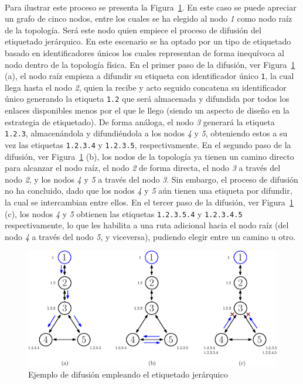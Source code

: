 \\
Para ilustrar este proceso se presenta la Figura~\ref{fig:sota_8_topo_difusion_1}. En este caso se puede apreciar un grafo de cinco nodos, entre los cuales se ha elegido al nodo \textit{1} como nodo raíz de la topología. Será este nodo quien empiece el proceso de difusión del etiquetado jerárquico. En este escenario se ha optado por un tipo de etiquetado basado en identificadores únicos los cuales representan de forma inequívoca al nodo dentro de la topología física. En el primer paso de la difusión, ver  Figura~\ref{fig:sota_8_topo_difusion_1} (a), el nodo raíz empieza a difundir su etiqueta con identificador único \texttt{1}, la cual llega hasta el nodo \textit{2}, quien la recibe y acto seguido concatena su identificador único generando la etiqueta \texttt{1.2} que será almacenada y difundida por todos los enlaces disponibles menos por el que le llego (siendo un aspecto de diseño en la estrategia de etiquetado). De forma análoga, el nodo \textit{3} generará la etiqueta \texttt{1.2.3}, almacenándola y difundiéndola a los nodos \textit{4} y \textit{5}, obteniendo estos a su vez las etiquetas \texttt{1.2.3.4} y \texttt{1.2.3.5}, respectivamente. En el segundo paso de la difusión, ver  Figura~\ref{fig:sota_8_topo_difusion_1} (b), los nodos de la topología ya tienen un camino directo para alcanzar el nodo raíz, el nodo \textit{2} de forma directa, el nodo \textit{3} a través del nodo \textit{2}, y los nodos \textit{4} y \textit{5} a través del nodo \textit{3}. Sin embargo, el proceso de difusión no ha concluido, dado que los nodos \textit{4} y \textit{5} aún tienen una etiqueta por difundir, la cual se intercambian entre ellos. En el tercer paso de la difusión, ver  Figura~\ref{fig:sota_8_topo_difusion_1} (c), los nodos \textit{4} y \textit{5} obtienen las etiquetas \texttt{1.2.3.5.4} y \texttt{1.2.3.4.5} respectivamente, lo que les habilita a una ruta adicional hacia el nodo raíz (del nodo \textit{4} a través del nodo \textit{5}, y viceversa), pudiendo elegir entre un camino u otro.  

\begin{figure}[ht!]
   \centering
   \includegraphics[width=\textwidth]{fig/02_sota/sota_8_topo_difusion_1.eps}
   \caption{Ejemplo de difusión empleando el etiquetado jerárquico}
   \label{fig:sota_8_topo_difusion_1}
\end{figure}

